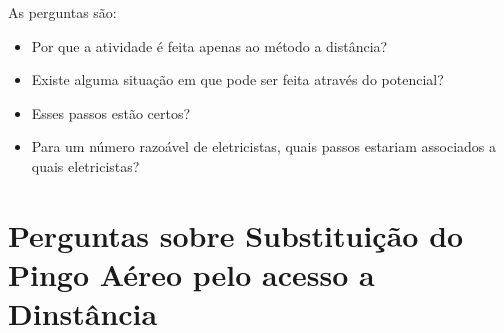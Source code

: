 As perguntas são: 

\begin{itemize}
    \item Por que a atividade é feita apenas ao método a distância? 
    \item Existe alguma situação em que pode ser feita através do potencial?
    \item Esses passos estão certos? 
    \item Para um número razoável de eletricistas, quais passos estariam associados a quais eletricistas? 
\end{itemize}

\section{Perguntas sobre Substituição do Pingo Aéreo pelo acesso a Dinstância} 


